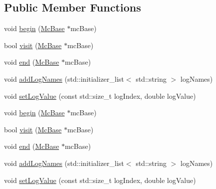 \subsection*{Public Member Functions}
\begin{DoxyCompactItemize}
\item 
void \hyperlink{classnifty_1_1graph_1_1optimization_1_1multicut_1_1PyMulticutVisitorBase_ad1ee20866d74a56870c79450985f2b25}{begin} (\hyperlink{classnifty_1_1graph_1_1optimization_1_1multicut_1_1PyMulticutVisitorBase_a8f1b90c5df32b68d5f5cad637dca2362}{Mc\+Base} $\ast$mc\+Base)
\item 
bool \hyperlink{classnifty_1_1graph_1_1optimization_1_1multicut_1_1PyMulticutVisitorBase_a9098514dad97a9ab4bbc101881db8ee5}{visit} (\hyperlink{classnifty_1_1graph_1_1optimization_1_1multicut_1_1PyMulticutVisitorBase_a8f1b90c5df32b68d5f5cad637dca2362}{Mc\+Base} $\ast$mc\+Base)
\item 
void \hyperlink{classnifty_1_1graph_1_1optimization_1_1multicut_1_1PyMulticutVisitorBase_a86b2db443a8e0c6430f5eff53e82dff1}{end} (\hyperlink{classnifty_1_1graph_1_1optimization_1_1multicut_1_1PyMulticutVisitorBase_a8f1b90c5df32b68d5f5cad637dca2362}{Mc\+Base} $\ast$mc\+Base)
\item 
void \hyperlink{classnifty_1_1graph_1_1optimization_1_1multicut_1_1PyMulticutVisitorBase_afaca2ac7c2c4c2492435350a66df4c33}{add\+Log\+Names} (std\+::initializer\+\_\+list$<$ std\+::string $>$ log\+Names)
\item 
void \hyperlink{classnifty_1_1graph_1_1optimization_1_1multicut_1_1PyMulticutVisitorBase_a4709749618f92f43c7efb4280e773075}{set\+Log\+Value} (const std\+::size\+\_\+t log\+Index, double log\+Value)
\item 
void \hyperlink{classnifty_1_1graph_1_1optimization_1_1multicut_1_1PyMulticutVisitorBase_ad1ee20866d74a56870c79450985f2b25}{begin} (\hyperlink{classnifty_1_1graph_1_1optimization_1_1multicut_1_1PyMulticutVisitorBase_a8f1b90c5df32b68d5f5cad637dca2362}{Mc\+Base} $\ast$mc\+Base)
\item 
bool \hyperlink{classnifty_1_1graph_1_1optimization_1_1multicut_1_1PyMulticutVisitorBase_a9098514dad97a9ab4bbc101881db8ee5}{visit} (\hyperlink{classnifty_1_1graph_1_1optimization_1_1multicut_1_1PyMulticutVisitorBase_a8f1b90c5df32b68d5f5cad637dca2362}{Mc\+Base} $\ast$mc\+Base)
\item 
void \hyperlink{classnifty_1_1graph_1_1optimization_1_1multicut_1_1PyMulticutVisitorBase_a86b2db443a8e0c6430f5eff53e82dff1}{end} (\hyperlink{classnifty_1_1graph_1_1optimization_1_1multicut_1_1PyMulticutVisitorBase_a8f1b90c5df32b68d5f5cad637dca2362}{Mc\+Base} $\ast$mc\+Base)
\item 
void \hyperlink{classnifty_1_1graph_1_1optimization_1_1multicut_1_1PyMulticutVisitorBase_afaca2ac7c2c4c2492435350a66df4c33}{add\+Log\+Names} (std\+::initializer\+\_\+list$<$ std\+::string $>$ log\+Names)
\item 
void \hyperlink{classnifty_1_1graph_1_1optimization_1_1multicut_1_1PyMulticutVisitorBase_a4709749618f92f43c7efb4280e773075}{set\+Log\+Value} (const std\+::size\+\_\+t log\+Index, double log\+Value)
\end{DoxyCompactItemize}


